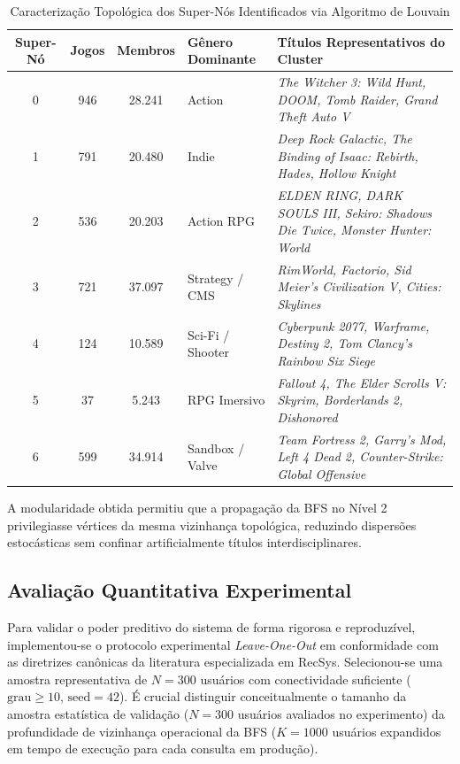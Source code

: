 \documentclass[conference]{IEEEtran}
\begin{document}
\begin{table}[!t]
\caption{Caracterização Topológica dos Super-Nós Identificados via Algoritmo de Louvain}
\centering
\begin{tabular}{c c c l l}
\toprule
\textbf{Super-Nó} & \textbf{Jogos} & \textbf{Membros} & \textbf{Gênero Dominante} & \textbf{Títulos Representativos do Cluster} \\
\midrule
0 & 946 & 28.241 & Action & \textit{The Witcher 3: Wild Hunt, DOOM, Tomb Raider, Grand Theft Auto V} \\
1 & 791 & 20.480 & Indie & \textit{Deep Rock Galactic, The Binding of Isaac: Rebirth, Hades, Hollow Knight} \\
2 & 536 & 20.203 & Action RPG & \textit{ELDEN RING, DARK SOULS III, Sekiro: Shadows Die Twice, Monster Hunter: World} \\
3 & 721 & 37.097 & Strategy / CMS & \textit{RimWorld, Factorio, Sid Meier's Civilization V, Cities: Skylines} \\
4 & 124 & 10.589 & Sci-Fi / Shooter & \textit{Cyberpunk 2077, Warframe, Destiny 2, Tom Clancy's Rainbow Six Siege} \\
5 & 37  & 5.243  & RPG Imersivo & \textit{Fallout 4, The Elder Scrolls V: Skyrim, Borderlands 2, Dishonored} \\
6 & 599 & 34.914 & Sandbox / Valve & \textit{Team Fortress 2, Garry's Mod, Left 4 Dead 2, Counter-Strike: Global Offensive} \\
\bottomrule
\end{tabular}
\label{tab:supernos}
\end{table}

A modularidade obtida permitiu que a propagação da BFS no Nível 2 privilegiasse vértices da mesma vizinhança topológica, reduzindo dispersões estocásticas sem confinar artificialmente títulos interdisciplinares.

\subsection{Avaliação Quantitativa Experimental}
Para validar o poder preditivo do sistema de forma rigorosa e reproduzível, implementou-se o protocolo experimental \textit{Leave-One-Out} em conformidade com as diretrizes canônicas da literatura especializada em RecSys. Selecionou-se uma amostra representativa de $N = 300$ usuários com conectividade suficiente ($\text{grau} \ge 10$, $\text{seed} = 42$). É crucial distinguir conceitualmente o tamanho da amostra estatística de validação ($N = 300$ usuários avaliados no experimento) da profundidade de vizinhança operacional da BFS ($K = 1000$ usuários expandidos em tempo de execução para cada consulta em produção).
\end{document}
